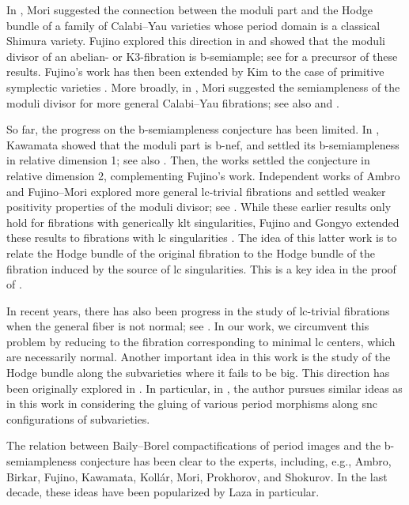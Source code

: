 \documentclass{amsart}
\theoremstyle{definition}
\theoremstyle{remark}
\numberwithin{equation}{section}
\begin{document}
In \cite[Rmk.~5.15.9.(ii)]{Mor87}, Mori suggested the connection between the moduli part and the Hodge bundle of a family of Calabi--Yau varieties whose period domain is a classical Shimura variety. 
Fujino explored this direction in \cite{Fuj03} and showed that the moduli divisor of an abelian- or K3-fibration is  b-semiample; see \cite{Ueno1978} for a precursor of these results. Fujino's work has then been extended by Kim to the case of primitive symplectic varieties \cite{Kim25}. More broadly, in \cite[9.12]{Mor87}, Mori suggested the semiampleness of the moduli divisor for more general Calabi--Yau fibrations; see also \cite[Conj.~6]{AmbroPhD} and \cite[Conj.~7.13.1]{PS09}. 

So far, the progress on the b-semiampleness conjecture has been limited. In \cite{Kaw1997, Kaw1998}, Kawamata showed that the moduli part is b-nef, and settled its b-semiampleness in relative dimension 1; see also \cite{PS09}. Then, the works \cite{Fil20,babwild} settled the conjecture in relative dimension 2, complementing Fujino's work. Independent works of Ambro and Fujino--Mori explored more general lc-trivial fibrations and settled weaker positivity properties of the moduli divisor;
see \cite{Amb04,Amb05, FM00}.
While these earlier results only hold for fibrations with generically klt singularities, Fujino and Gongyo extended these results to fibrations with lc singularities \cite{FG14}.
The idea of this latter work is to relate the Hodge bundle of the original fibration to the Hodge bundle of the fibration induced by the source of lc singularities.
This is a key idea in the proof of .

In recent years, there has also been progress in the study of lc-trivial fibrations when the general fiber is not normal;
see \cite{MR4458545,MR4458546}.
In our work, we circumvent this problem by reducing to the fibration corresponding to minimal lc centers, which are necessarily normal. Another important idea in this work is the study of the Hodge bundle along the subvarieties where it fails to be big.
This direction has been originally explored in \cite{FL19,Flo23}.
In particular, in \cite{Flo23}, the author pursues similar ideas as in this work in considering the gluing of various period morphisms along snc configurations of subvarieties. 

The relation between Baily--Borel compactifications of period images and the b-semiampleness conjecture has been clear to the experts, including, e.g., Ambro, Birkar, Fujino, Kawamata, Koll\'{a}r, Mori, Prokhorov, and Shokurov.  In the last decade, these ideas have been popularized by Laza in particular.
\end{document}
